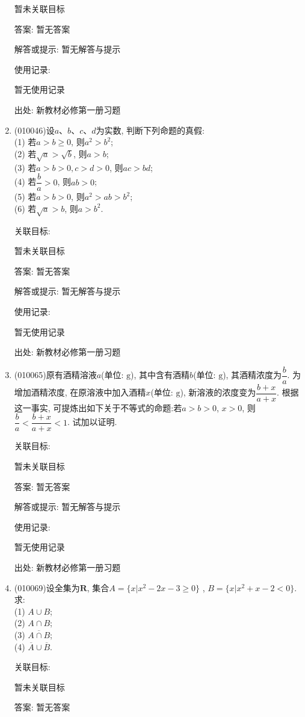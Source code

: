 \documentclass[10pt,a4paper]{article}
\begin{document}
\begin{enumerate}[1.]
暂未关联目标

答案: 暂无答案

解答或提示: 暂无解答与提示

使用记录:

暂无使用记录


出处: 新教材必修第一册习题
\item { (010046)}设$a$、$b$、$c$、$d$为实数, 判断下列命题的真假:\\
(1) 若$a>b\ge 0$, 则$a^2>b^2$;\\
(2) 若$\sqrt a>\sqrt b$, 则$a>b$;\\
(3) 若$a>b>0, c>d>0$, 则$ac>bd$;\\
(4) 若$\dfrac ba>0$, 则$ab>0$;\\
(5) 若$a>b>0$, 则$a^2>ab>b^2$;\\
(6) 若$\sqrt a>b$, 则$a>b^2$.


关联目标:

暂未关联目标

答案: 暂无答案

解答或提示: 暂无解答与提示

使用记录:

暂无使用记录


出处: 新教材必修第一册习题
\item { (010065)}原有酒精溶液$a$(单位: $\text{g}$), 其中含有酒精$b$(单位: $\text{g}$), 其酒精浓度为$\dfrac ba$. 为增加酒精浓度, 在原溶液中加入酒精$x$(单位: $\text{g}$), 新溶液的浓度变为$\dfrac{b+x}{a+x}$. 根据这一事实, 可提炼出如下关于不等式的命题:若$a>b>0$, $x>0$, 则$\dfrac ba<\dfrac{b+x}{a+x}<1$. 试加以证明.


关联目标:

暂未关联目标

答案: 暂无答案

解答或提示: 暂无解答与提示

使用记录:

暂无使用记录


出处: 新教材必修第一册习题
\item { (010069)}设全集为$\mathbf{R}$, 集合$A=\{x|x^2-2x-3\ge 0\}$
, $B=\{x|x^2+x-2<0\}$. 求:\\
(1) $A\cup B$;\\
(2) $A\cap B$;\\
(3) $\overline{A\cap B}$;\\
(4) $\overline A\cup \overline B$.


关联目标:

暂未关联目标

答案: 暂无答案


\end{enumerate}
\end{document}

